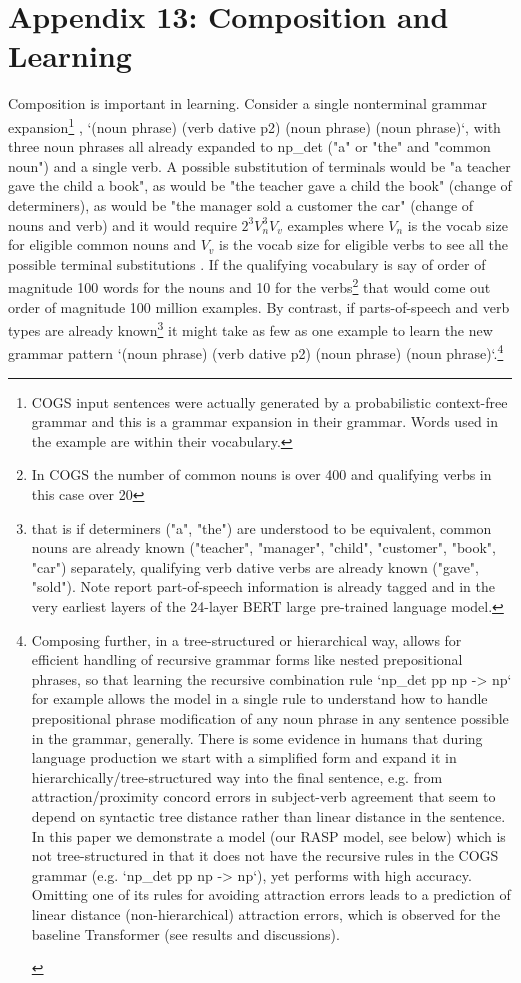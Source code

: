 \documentclass[11pt]{article}
\begin{document}
\section{Appendix 13: Composition and Learning}
Composition is important in learning. Consider a single nonterminal grammar expansion\footnote{COGS input sentences were actually generated by a probabilistic context-free grammar and this is a grammar expansion in their grammar. Words used in the example are within their vocabulary.} , `(noun phrase) (verb dative p2) (noun phrase) (noun phrase)`, with three noun phrases all already expanded to np\_det ("a" or "the" and "common noun") and a single verb. A possible substitution of terminals would be "a teacher gave the child a book", as would be "the teacher gave a child the book" (change of determiners), as would be "the manager sold a customer the car" (change of nouns and verb) and it would require $2^3 V_n^3V_v $ examples where $V_n$ is the vocab size for eligible common nouns and $V_v$ is the vocab size for eligible verbs to see all the possible terminal substitutions . If the qualifying vocabulary is say of order of magnitude 100 words for the nouns and 10 for the verbs\footnote{In COGS the number of common nouns is over 400 and qualifying verbs in this case over 20} that would come out order of magnitude 100 million examples. By contrast, if parts-of-speech and verb types are already known\footnote{that is if determiners ("a", "the") are understood to be equivalent, common nouns are already known ("teacher", "manager", "child", "customer", "book", "car") separately, qualifying verb dative verbs are already known ("gave", "sold"). Note \cite{tenney2019bertrediscoversclassicalnlp} report part-of-speech information is already tagged and in the very earliest layers of the 24-layer BERT large pre-trained language model.} it might take as few as one example to learn the new grammar pattern `(noun phrase) (verb dative p2) (noun phrase) (noun phrase)`.\footnote{
\begin{tiny}
Composing further, in a tree-structured or hierarchical way, allows for efficient handling of recursive grammar forms like nested prepositional phrases, so that learning the recursive combination rule `np\_det pp np -> np` for example allows the model in a single rule to understand how to handle prepositional phrase modification of any noun phrase in any sentence possible in the grammar, generally. 
There is some evidence in humans that during language production we start with a simplified form and expand it in hierarchically/tree-structured way into the final sentence, e.g. from attraction/proximity concord errors in subject-verb agreement that seem to depend on syntactic tree distance rather than linear distance in the sentence\cite{FRANCK2006173}\cite{VIGLIOCCO1998B13}.
In this paper we demonstrate a model (our RASP model, see below) which is not tree-structured in that it does not have the recursive rules in the COGS grammar (e.g. `np\_det pp np -> np`), yet performs with high accuracy. Omitting one of its rules for avoiding attraction errors leads to a prediction of linear distance (non-hierarchical) attraction errors, which is observed for the baseline \cite{Wu2023} Transformer (see results and discussions).
\end{tiny}
}
\end{document}
